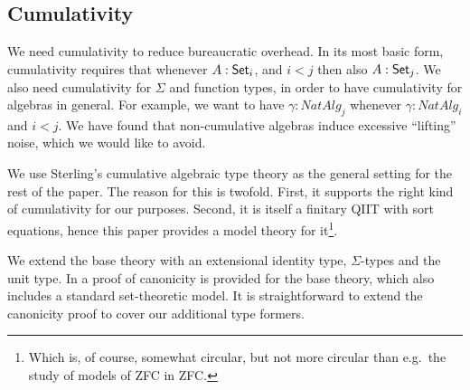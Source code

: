 \documentclass{llncs}
\begin{document}

\subsection{Cumulativity}


We need cumulativity to reduce bureaucratic overhead. In its most basic form,
cumulativity requires that whenever $A : \mathsf{Set}_i$, and $i < j$ then also $A :
\mathsf{Set}_j$. We also need cumulativity for $\Sigma$ and function types, in order to
have cumulativity for algebras in general. For example, we want to have $\gamma
: NatAlg_j$ whenever $\gamma : NatAlg_i$ and $i < j$. We have found that
non-cumulative algebras induce excessive ``lifting'' noise, which we would like
to avoid.


We use Sterling's cumulative algebraic type theory \cite{TODO} as the general
setting for the rest of the paper. The reason for this is twofold. First, it
supports the right kind of cumulativity for our purposes. Second, it is itself a
finitary QIIT with sort equations, hence this paper provides a model theory for
it\footnote{Which is, of course, somewhat circular, but not more circular than
  e.g.\ the study of models of ZFC in ZFC.}.

We extend the base theory with an extensional identity type, $\Sigma$-types and
the unit type. In \cite{TODO} a proof of canonicity is provided for the base
theory, which also includes a standard set-theoretic model. It is
straightforward to extend the canonicity proof to cover our additional type
formers.
\end{document}
